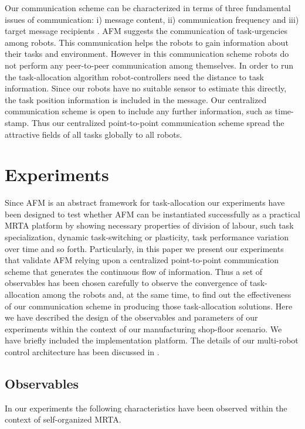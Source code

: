 \documentclass[smallcondensed]{svjour3}
\begin{document}
Our communication scheme can be characterized in terms of three fundamental issues of communication: i) message content, ii) communication frequency and iii) target message recipients \citep{Gerkey+2001}. AFM suggests the communication of task-urgencies among robots. This communication helps the robots to gain information about their tasks and environment. However in this communication scheme robots do not perform any peer-to-peer communication among themselves.  In order to run the task-allocation algorithm robot-controllers need the distance to task information. Since our robots have no suitable sensor to estimate this directly, the task position information is included in the message. Our centralized communication scheme is open to include any further information, such as time-stamp. Thus our centralized point-to-point communication scheme spread the attractive fields of all tasks globally to all robots.
\section{Experiments}
\label{sec:expt}
Since AFM is an abstract framework for task-allocation our experiments have been designed to test whether AFM can be instantiated successfully as a practical MRTA platform by showing necessary properties of division of labour, such task specialization, dynamic task-switching or plasticity,  task performance variation over time and so forth. Particularly, in this paper we present our experiments that validate AFM relying upon a centralized point-to-point communication scheme that generates the continuous flow of information. Thus a set of observables has been chosen carefully to observe the convergence of  task-allocation among the robots and, at the same time, to find out the effectiveness of our communication scheme in producing those task-allocation solutions. Here we have described the design of the observables and parameters of our experiments within the context of our manufacturing shop-floor scenario.  We have briefly included the implementation platform. The details of our multi-robot control architecture has been discussed in \cite{Sarker2010control}.
\subsection{Observables}
In our experiments the following characteristics have been observed within the context of self-organized MRTA.
\end{document}
